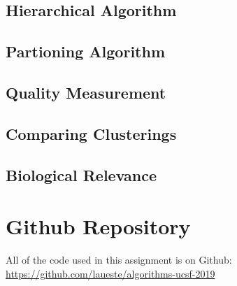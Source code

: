 \documentclass{article}
\begin{document}
\subsection{Hierarchical Algorithm}
\subsection{Partioning Algorithm}
\subsection{Quality Measurement}
\subsection{Comparing Clusterings}
\subsection{Biological Relevance}



\section{Github Repository}
All of the code used in this assignment is on Github: \url{https://github.com/laueste/algorithms-ucsf-2019}
\end{document}
